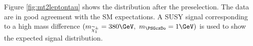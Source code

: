 


Figure \ref{fig:mt2leptontau} %
shows the \mttwo distribution after the preselection.
The data are in good agreement with the SM expectations. A SUSY signal corresponding to a high mass difference 
 $(m_{\chione}=380\GeV,~m_{\PSGczDo}=1\GeV)$ is used to show the expected signal distribution.

